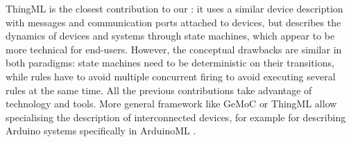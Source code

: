 ThingML \cite{Harrand-Fleurey-Morin-Husa:2016} is the closest contribution to our \DSL: it uses a similar device description with messages and communication ports attached to devices, but describes the dynamics of devices and systems through state machines, which appear to be more technical for end-users. However, the conceptual drawbacks are similar in both paradigms: state machines need to be deterministic on their transitions, while rules have to avoid multiple concurrent firing to avoid executing several rules at the same time. All the previous contributions take advantage of \MDE technology and tools. More general \MDE framework like GeMoC \cite{Bousse-Degueule-Vojtisek-etAl:2016} or ThingML allow specialising the description of interconnected devices, for example for describing Arduino systems specifically in ArduinoML \cite{Mosser-Collet-BlayFornarino:2014}.